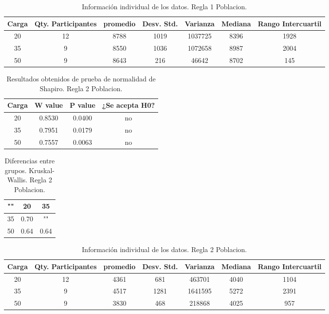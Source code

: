 \documentclass{article}
\begin{document}
\begin{table}[htb]
    \centering
    \caption{Informaci\'on individual de los datos. Regla 1 Poblacion.} 
    \begin{tabular}{|c|c|c|c|c|c|c|}
    \hline
    Carga & Qty. Participantes & promedio & Desv. Std. & Varianza & Mediana & Rango Intercuartil  \\
    \hline
    20 & 12 & 8788 & 1019 & 1037725 & 8396 & 1928 \\
    \hline
    35 & 9 & 8550 & 1036 & 1072658 & 8987 & 2004 \\
    \hline
    50 & 9 & 8643 & 216 & 46642 & 8702 & 145 \\
    \hline
\end{tabular}
    \label{cuadro 21}
\end{table}






\begin{table}[ht]
    \centering
    \caption{Resultados obtenidos de prueba de normalidad de Shapiro. Regla 2 Poblacion.} 
    \begin{tabular}{|c|c|c|c|}
    \hline
    Carga & W value & P value & ¿Se acepta H0?  \\
    \hline
    20 & 0.8530 & 0.0400 & no \\
    \hline 
     35 & 0.7951 & 0.0179 &  no \\
    \hline 
    50 & 0.7557 & 0.0063 & no \\
    \hline 
\end{tabular}
    \label{cuadro 22}
\end{table}

\begin{table}[htb]
    \centering
    \caption{Diferencias entre grupos. Kruskal-Wallis. Regla 2 Poblacion.} 
    \begin{tabular}{|c|c|c|}
    \hline
    "" & 20 & 35 \\
    \hline
    35 & 0.70 & ""  \\
    \hline
    50 & 0.64 & 0.64  \\
    \hline
\end{tabular}
    \label{cuadro 23}
\end{table}

\begin{table}[htb]
    \centering
    \caption{Informaci\'on individual de los datos. Regla 2 Poblacion.} 
    \begin{tabular}{|c|c|c|c|c|c|c|}
    \hline
    Carga & Qty. Participantes & promedio & Desv. Std. & Varianza & Mediana & Rango Intercuartil  \\
    \hline
    20 & 12 & 4361 & 681 & 463701 & 4040 & 1104 \\
    \hline
    35 & 9 & 4517 & 1281 & 1641595 & 5272 & 2391 \\
    \hline
    50 & 9 & 3830 & 468 & 218868 & 4025 & 957 \\
    \hline
\end{tabular}
    \label{cuadro 24}
\end{table}
\end{document}
